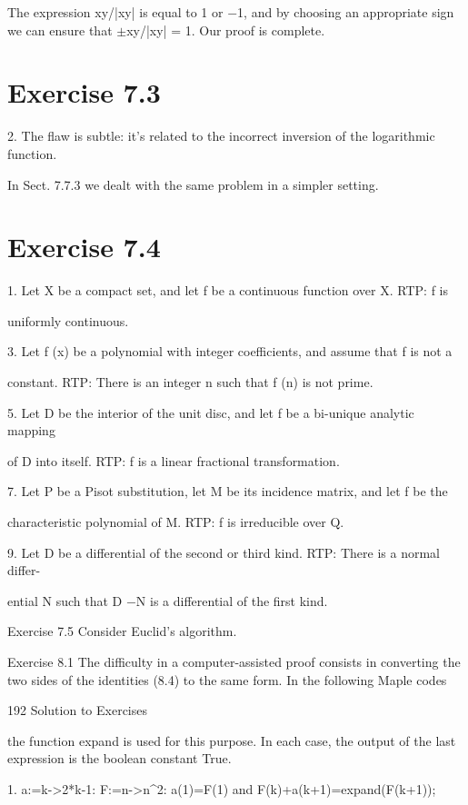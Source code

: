 \documentclass[11pt]{article}
\theoremstyle{plain}
\theoremstyle{definition}
\begin{document}
The expression xy/|xy| is equal to 1 or $-$1, and by choosing an appropriate sign we can ensure that $\pm$xy/|xy| = 1. Our proof is complete. 

\section{Exercise 7.3}

2. The flaw is subtle: it's related to the incorrect inversion of the logarithmic function.

In Sect. 7.7.3 we dealt with the same problem in a simpler setting.

\section{Exercise 7.4}

1. Let X be a compact set, and let f be a continuous function over X. RTP: f is

uniformly continuous.

3. Let f (x) be a polynomial with integer coefficients, and assume that f is not a

constant. RTP: There is an integer n such that f (n) is not prime.

5. Let D be the interior of the unit disc, and let f be a bi-unique analytic mapping

of D into itself. RTP: f is a linear fractional transformation.

7. Let P be a Pisot substitution, let M be its incidence matrix, and let f be the

characteristic polynomial of M. RTP: f is irreducible over Q.

9. Let D be a differential of the second or third kind. RTP: There is a normal differ-

ential N such that D $-$N is a differential of the first kind.

Exercise 7.5 Consider Euclid's algorithm.

Exercise 8.1 The difficulty in a computer-assisted proof consists in converting the two sides of the identities (8.4) to the same form. In the following Maple codes

192 Solution to Exercises

the function expand is used for this purpose. In each case, the output of the last expression is the boolean constant True.

1. a:=k->2*k-1: F:=n->n\^{}2: a(1)=F(1) and F(k)+a(k+1)=expand(F(k+1));
\end{document}
